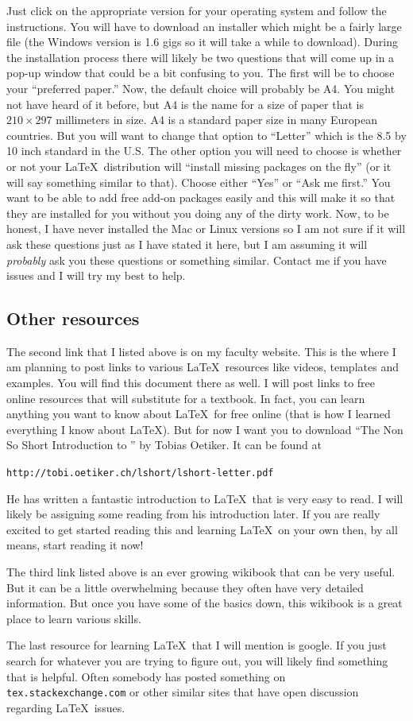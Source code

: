 \documentclass[11pt]{article}
\begin{document}
Just click on the appropriate version for your operating system and follow the instructions.  You will have to download an installer which might be a fairly large file (the Windows version is 1.6 gigs so it will take a while to download).  During the installation process there will likely be two questions that will come up in a pop-up window that could be a bit confusing to you. The first will be to choose your ``preferred paper.''  Now, the default choice will probably be A4.  You might not have heard of it before, but A4 is the name for a size of paper that is $210\times 297$ millimeters in size.  A4 is a standard paper size in many European countries.  But you will want to change that option to ``Letter'' which is the 8.5 by 10 inch standard in the U.S. The other option you will need to choose is whether or not your \LaTeX\ distribution will ``install missing packages on the fly'' (or it will say something similar to that).  Choose either ``Yes'' or ``Ask me first.''  You want to be able to add free add-on packages easily and this will make it so that they are installed for you without you doing any of the dirty work.  Now, to be honest, I have never installed the Mac or Linux versions so I am not sure if it will ask these questions just as I have stated it here, but I am assuming it will \emph{probably} ask you these questions or something similar.  Contact me if you have issues and I will try my best to help.

\subsection{Other resources}
The second link that I listed above is on my faculty website. This is the where I am planning to post links to various \LaTeX\ resources like videos, templates and examples. You will find this document there as well. I will post links to free online resources that will substitute for a textbook.  In fact, you can learn anything you want to know about \LaTeX\ for free online (that is how I learned everything I know about \LaTeX). But for now I want you to download ``The Non So Short Introduction to \LaTeXe'' by Tobias Oetiker. It can be found at 
\begin{center}
\verb|http://tobi.oetiker.ch/lshort/lshort-letter.pdf|
\end{center}
He has written a fantastic introduction to \LaTeX\ that is very easy to read.  I will likely be assigning some reading from his introduction later.  If you are really excited to get started reading this and learning \LaTeX\ on your own then, by all means, start reading it now!

The third link listed above is an ever growing wikibook that can be very useful.  But it can be a little overwhelming because they often have very detailed information.  But once you have some of the basics down, this wikibook is a great place to learn various skills.  

The last resource for learning \LaTeX\ that I will mention is google.  If you just search for whatever you are trying to figure out, you will likely find something that is helpful. Often somebody has posted something on \verb|tex.stackexchange.com| or other similar sites that have open discussion regarding \LaTeX\ issues.
\end{document}
